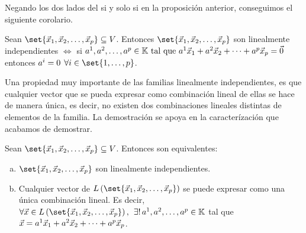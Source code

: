 \documentclass[../algebra_lineal.tex]{subfiles}
\begin{document}
Negando los dos lados del si y solo si en la proposición anterior, conseguimos el siguiente corolario.

\begin{corollary}
    \label{linear_independence_corollary}
    Sean $\set{\vlst{x}{p}} \subseteq V$. Entonces $\set{\vlst{x}{p}}$ son linealmente independientes $\iff$ si  ${a}^{1}, {a}^{2}, \dots, {a}^{p} \in \mathbb{K} \mathrm{\,\, tal \,\, que \,\,} {a}^{1}\vec{x}_{1}+{a}^{2}\vec{x}_{2}+\dots+{a}^{p}\vec{x}_{p} = \vec{0}$ entonces $a^i = 0 \spc \forall i \in  \set{1, \dots, p} $. 
\end{corollary}

Una propiedad muy importante de las familias linealmente independientes, es que cualquier vector que se pueda expresar como combinación lineal de ellas se hace de manera única, es decir, no existen dos combinaciones lineales distintas de elementos de la familia. La demostración se apoya en la caracterízación que acabamos de demostrar.

\begin{proposition}
    Sean $\set{\vlst{x}{p}} \subseteq V$. Entonces son equivalentes:
    \begin{enumerate}[a)]
        \item $\set{\vlst{x}{p}}$ son linealmente independientes.
        \item Cualquier vector de $\lspan{\set{\vlst{x}{p}}}$ se puede expresar como una única combinación lineal.  Es decir, $\forall \vx \in \lspan{\set{\vlst{x}{p}}}, \spc \exists! \, \slst{a}{p} \in \K$ tal que $\vec{x} = {a}^{1}\vec{x}_{1}+{a}^{2}\vec{x}_{2}+\dots+{a}^{p}\vec{x}_{p}$. 
    \end{enumerate}
\end{proposition}
\end{document}
